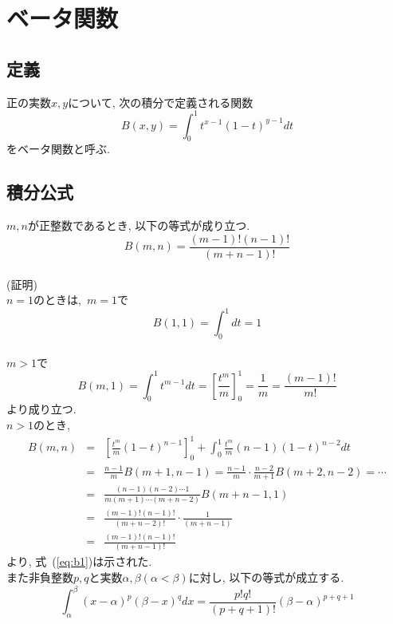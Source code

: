 \documentclass[a4paper,12pt,uplatex,dvipdfmx]{jsarticle}
\begin{document}
\section{ベータ関数}
\subsection{定義}
正の実数$x, y$について, 次の積分で定義される関数
\[
    B(x, y) = \int_0^1 t^{x-1}(1-t)^{y-1} dt
\]
をベータ関数と呼ぶ. \\

\subsection{積分公式}
$m, n$が正整数であるとき, 以下の等式が成り立つ.
\begin{equation}
    B(m, n) = \frac{(m-1)!(n-1)!}{(m+n-1)!}
    \label{eq:b1}
\end{equation} \\

(証明) \\
$n = 1$のときは,~$m = 1$で
\[
    B(1, 1) = \int_0^1 dt = 1
\] \\
$m > 1$で
\[
    B(m, 1) = \int_0^1 t^{m-1} dt = \left[\frac{t^m}{m}\right]_0^1 = \frac{1}{m} = \frac{(m-1)!}{m!}
\]
より成り立つ. \\
$n > 1$のとき, 
\begin{eqnarray*}
    B(m, n) & = & \left[\frac{t^m}{m}(1-t)^{n-1}\right]_0^1 + \int_0^1 \frac{t^m}{m}(n-1)(1-t)^{n-2} dt \\
    & = & \frac{n-1}{m}B(m+1, n-1)
    = \frac{n-1}{m}\cdot\frac{n-2}{m+1}B(m+2, n-2) = \cdots \\
    & = & \frac{(n-1)(n-2)\cdots 1}{m(m+1)\cdots(m+n-2)}B(m+n-1, 1) \\
    & = & \frac{(m-1)!(n-1)!}{(m+n-2)!}\cdot\frac{1}{(m+n-1)}\\
    & = & \frac{(m-1)!(n-1)!}{(m+n-1)!}
\end{eqnarray*}
より, 式~(\ref{eq:b1})は示された. \\

また非負整数$p, q$と実数$\alpha, \beta(\alpha < \beta)$に対し, 以下の等式が成立する.
\begin{equation}
    \int_{\alpha}^{\beta}(x-\alpha)^{p}(\beta-x)^{q} dx = \frac{p!q!}{(p+q+1)!}(\beta-\alpha)^{p+q+1}
    \label{eq:b2}
\end{equation} \\
\end{document}
